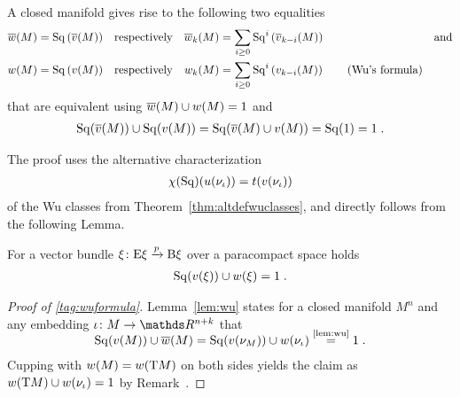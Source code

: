 \begin{Thm}[Wu]\label{thm:wu}
  A closed manifold gives rise to the following two equalities
  \begin{align}\notag
    {\overline{w}}(M) &= \mathrm{Sq}\left({\overline{v}}(M)\right)
    &\text{respectively}&
    &{\overline{w}_{k}}(M) &= \sum_{i\geq0} \mathrm{Sq}^{i}\left({\overline{v}_{k-i}}(M)\right)
    &\text{and}
    \\
    {w}(M) &= \mathrm{Sq}\left({v}(M)\right)
    &\text{respectively}&
    &{w_{k}}(M) &= \sum_{i\geq0} \mathrm{Sq}^{i}\left({v_{k-i}}(M)\right)
    \label{tag:wuformula}\tag{Wu's formula}
  \end{align}
  that are equivalent using
  ${\overline{w}}(M)\cup{w}(M) = 1$ and
  \begin{gather*}
    \mathrm{Sq}({\overline{v}}(M))\cup\mathrm{Sq}({v}(M))
    = \mathrm{Sq}({\overline{v}}(M)\cup{v}(M))
    = \mathrm{Sq}(1)
    = 1
    \;.
  \end{gather*}
\end{Thm}
The proof uses the alternative characterization
\begin{gather*}
  \chi(\mathrm{Sq})({u}(\nu_{{\iota}})) = t({v}(\nu_{{\iota}}))
\end{gather*}
of the Wu classes from Theorem~\ref{thm:altdefwuclasses}, and directly
follows from the following Lemma.
\begin{Lem}\label{lem:wu}
  For a vector bundle $\xi\colon \mathrm{E}\xi\xrightarrow{p}\mathrm{B}\xi$ over a
  paracompact space holds
  \begin{gather*}
    \mathrm{Sq}({v}(\xi)) \cup {w}(\xi)= 1
    \;.
  \end{gather*}
\end{Lem}
\begin{proof}[Proof of \ref{tag:wuformula}]
  Lemma~\ref{lem:wu} states for a closed manifold $M^n$ and any
  embedding $\emb\colon M\to\R^{n+k}$ that
  \begin{gather*}
    \SwapAboveDisplaySkip
    \SQ(\V{M}) \cup \dualW{M}
    = \SQ(\V{\N M}) \cup \W{\N{\emb}}
    \cequalsby{\ref{lem:wu}} 1
    \;.
  \end{gather*}
  Cupping with ${w}(M)={w}(\mathrm{T}M)$ on both sides yields the claim
  as ${w}(\mathrm{T}M) \cup {w}(\nu_{{\iota}}) = 1$ by
  Remark~.
\end{proof}
